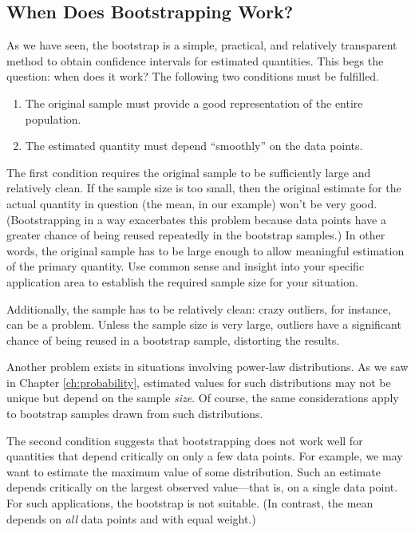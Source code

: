 \vspace*{-6pt}
\subsection{When Does Bootstrapping Work?}

As we have seen, the bootstrap is a simple, practical, and relatively
transparent method to obtain confidence intervals for estimated
quantities. This begs the question: when does it work?  The following
two conditions must be fulfilled.
\begin{enumerate}
\item The original sample must provide a good representation of the
  entire population.
\item The estimated quantity must depend ``smoothly'' on the data
  points.
\end{enumerate}

The first condition requires the original sample to be sufficiently
large and relatively clean. If the sample size is too small, then the
original estimate for the actual quantity in question (the mean, in
our example) won't be very good. (Bootstrapping in a way exacerbates
this problem because data points have a greater chance of being reused
repeatedly in the bootstrap samples.) In other words, the original
sample has to be large enough to allow meaningful estimation of the
primary quantity. Use common sense and insight into your specific
application area to establish the required sample size for your
situation.

Additionally, the sample has to be relatively clean: crazy outliers,
for instance, can be a problem. Unless the sample size is very large,
outliers have a significant chance of being reused in a bootstrap
sample, distorting the results.

Another problem exists in situations involving power-law
distributions. As we saw in Chapter \ref{ch:probability}, estimated
values for such distributions may not be unique but depend on the
sample \emph{size}. Of course, the same considerations apply to
bootstrap samples drawn from such distributions.

The second condition suggests that bootstrapping does not work well
for quantities that depend critically on only a few data points. For
example, we may want to estimate the maximum value of some
distribution.  Such an estimate depends critically on the largest
observed value---that is, on a single data point. For such
applications, the bootstrap is not suitable. (In contrast, the mean
depends on \emph{all} data points and with equal weight.)


